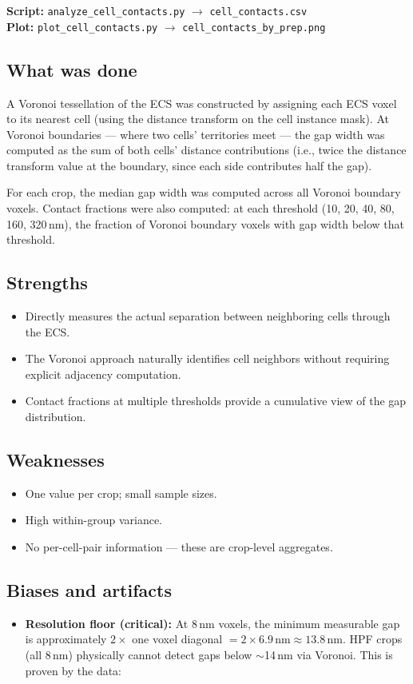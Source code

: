 \documentclass[times, twoside]{zHenriquesLab-StyleBioRxiv}
\begin{document}
{\small\textbf{Script:} \texttt{analyze\_cell\_contacts.py}
$\rightarrow$ \texttt{cell\_contacts.csv} \\
\textbf{Plot:} \texttt{plot\_cell\_contacts.py}
$\rightarrow$ \texttt{cell\_contacts\_by\_prep.png}}

\subsection*{What was done}
A Voronoi tessellation of the ECS was constructed by assigning each ECS voxel to its nearest cell (using the distance transform on the cell instance mask). At Voronoi boundaries --- where two cells' territories meet --- the gap width was computed as the sum of both cells' distance contributions (i.e., twice the distance transform value at the boundary, since each side contributes half the gap).

For each crop, the median gap width was computed across all Voronoi boundary voxels. Contact fractions were also computed: at each threshold (10, 20, 40, 80, 160, 320\,nm), the fraction of Voronoi boundary voxels with gap width below that threshold.

\subsection*{Strengths}
\begin{itemize}[nosep]
\item Directly measures the actual separation between neighboring cells through the ECS.
\item The Voronoi approach naturally identifies cell neighbors without requiring explicit adjacency computation.
\item Contact fractions at multiple thresholds provide a cumulative view of the gap distribution.
\end{itemize}

\subsection*{Weaknesses}
\begin{itemize}[nosep]
\item One value per crop; small sample sizes.
\item High within-group variance.
\item No per-cell-pair information --- these are crop-level aggregates.
\end{itemize}

\subsection*{Biases and artifacts}
\begin{itemize}[nosep]
\item \textbf{Resolution floor (critical):} At 8\,nm voxels, the minimum measurable gap is approximately $2 \times$ one voxel diagonal $= 2 \times 6.9\,\text{nm} \approx 13.8\,\text{nm}$. HPF crops (all 8\,nm) physically cannot detect gaps below $\sim$14\,nm via Voronoi. This is proven by the data:
\end{itemize}
\end{document}
